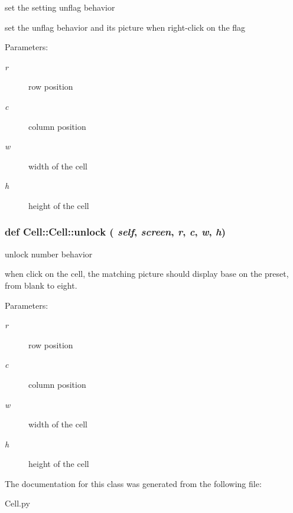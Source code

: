 set the setting unflag behavior 

set the unflag behavior and its picture when right-click on the flag \begin{Desc}
\item[Parameters:]
\begin{description}
\item[{\em r}]row position \item[{\em c}]column position \item[{\em w}]width of the cell \item[{\em h}]height of the cell \end{description}
\end{Desc}
\subsubsection{\setlength{\rightskip}{0pt plus 5cm}def Cell::Cell::unlock ( {\em self},  {\em screen},  {\em r},  {\em c},  {\em w},  {\em h})}\label{classCell_1_1Cell_b3d0d40e05e9e72b09b3a5fa53349311}


unlock number behavior 

when click on the cell, the matching picture should display base on the preset, from blank to eight. \begin{Desc}
\item[Parameters:]
\begin{description}
\item[{\em r}]row position \item[{\em c}]column position \item[{\em w}]width of the cell \item[{\em h}]height of the cell \end{description}
\end{Desc}


The documentation for this class was generated from the following file:\begin{CompactItemize}
\item 
Cell.py\end{CompactItemize}
